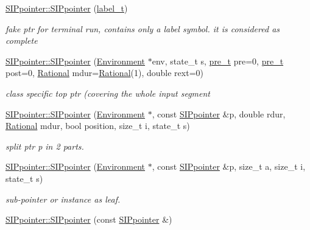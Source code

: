 \begin{DoxyCompactItemize}
\mbox{\hyperlink{group__table_gafcef62ae9e6a74448beec7ac040f6d7c}{S\+I\+Ppointer\+::\+S\+I\+Ppointer}} (\mbox{\hyperlink{group__output_ga22fde970e635fcf63962743b2d5c441d}{label\+\_\+t}})
\begin{DoxyCompactList}\small\item\em fake ptr for terminal run, contains only a label symbol. it is considered as complete \end{DoxyCompactList}\item 
\mbox{\hyperlink{group__table_ga5470d875405a71931e2349915201da20}{S\+I\+Ppointer\+::\+S\+I\+Ppointer}} (\mbox{\hyperlink{classEnvironment}{Environment}} $\ast$env, state\+\_\+t s, \mbox{\hyperlink{group__general_ga092fe8b972dfa977c2a0886720a7731e}{pre\+\_\+t}} pre=0, \mbox{\hyperlink{group__general_ga092fe8b972dfa977c2a0886720a7731e}{pre\+\_\+t}} post=0, \mbox{\hyperlink{classRational}{Rational}} mdur=\mbox{\hyperlink{classRational}{Rational}}(1), double rext=0)
\begin{DoxyCompactList}\small\item\em class specific top ptr (covering the whole input segment \end{DoxyCompactList}\item 
\mbox{\hyperlink{group__table_gaeea3246bf0f27b8b4a0a930f7d1a4379}{S\+I\+Ppointer\+::\+S\+I\+Ppointer}} (\mbox{\hyperlink{classEnvironment}{Environment}} $\ast$, const \mbox{\hyperlink{classSIPpointer}{S\+I\+Ppointer}} \&p, double rdur, \mbox{\hyperlink{classRational}{Rational}} mdur, bool position, size\+\_\+t i, state\+\_\+t s)
\begin{DoxyCompactList}\small\item\em split ptr p in 2 parts. \end{DoxyCompactList}\item 
\mbox{\hyperlink{group__table_gad83be64e20b13419994b3e9ae23654d1}{S\+I\+Ppointer\+::\+S\+I\+Ppointer}} (\mbox{\hyperlink{classEnvironment}{Environment}} $\ast$, const \mbox{\hyperlink{classSIPpointer}{S\+I\+Ppointer}} \&p, size\+\_\+t a, size\+\_\+t i, state\+\_\+t s)
\begin{DoxyCompactList}\small\item\em sub-\/pointer or instance as leaf. \end{DoxyCompactList}\item 
\mbox{\label{group__table_ga32c45b7b04d59e932c5b43ba03b47b4e}} 
\mbox{\hyperlink{group__table_ga32c45b7b04d59e932c5b43ba03b47b4e}{S\+I\+Ppointer\+::\+S\+I\+Ppointer}} (const \mbox{\hyperlink{classSIPpointer}{S\+I\+Ppointer}} \&)

\end{DoxyCompactItemize}
